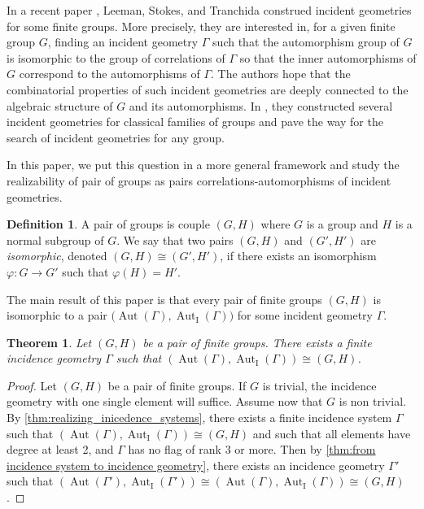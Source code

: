 \documentclass{amsart}
\newtheorem{thmx}{Theorem}
\theoremstyle{definition}
\newtheorem{definition}[theorem]{Definition}
\theoremstyle{remark}
\newcommand{\Aut}{\operatorname{Aut}}
\newcommand{\AutI}{\Aut_{\text{I}}}
\begin{document}
In a recent paper \cite{LST2025}, Leeman, Stokes, and Tranchida construed incident geometries for some finite groups. More precisely, they are interested in, for a given finite group $G$, finding an incident geometry $\Gamma$ such that the automorphism group of $G$ is isomorphic to the group of correlations of $\Gamma$ so that the inner automorphisms of $G$ correspond to the automorphisms of $\Gamma$. The authors hope that the combinatorial properties of such incident geometries are deeply connected to the algebraic structure of $G$ and its automorphisms. In \cite{LST2025}, they constructed several incident geometries for classical families of groups and pave the way for the search of incident geometries for any group. 

In this paper, we put this question in a more general framework and study the realizability of pair of groups as pairs correlations-automorphisms of incident geometries.

\begin{definition}\label{def:pair_of_groups}
A pair of groups is couple $(G,H)$ where $G$ is a group and $H$ is a normal subgroup of $G$. We say that two pairs $(G,H)$ and $(G',H')$ are \emph{isomorphic}, denoted $(G,H)\cong(G',H')$,  if there exists an isomorphism $\varphi\colon G\to G'$ such that $\varphi(H)=H'$.
\end{definition}

The main result of this paper is that every pair of finite groups $(G,H)$ is isomorphic to a pair $\big(\Aut(\Gamma),\AutI(\Gamma)\big)$ for some incident geometry $\Gamma$. 

\begin{thmx}\label{thmA}
Let $(G,H)$ be a pair of finite groups. There exists a finite incidence geometry $\Gamma$ such that $(\Aut(\Gamma),\AutI(\Gamma))\cong (G,H)$.
\end{thmx}

\begin{proof} Let $(G,H)$ be a pair of finite groups.
If $G$ is trivial, the incidence geometry with one single element will suffice. Assume now that $G$ is non trivial.
By \autoref{thm:realizing_inicedence_systems}, there exists a finite incidence system $\Gamma$ such that $(\Aut(\Gamma),\AutI(\Gamma))\cong (G,H)$ and such that all elements have degree at least 2, and $\Gamma$ has no flag of rank $3$ or more. Then by \autoref{thm:from incidence system to incidence geometry}, there exists an incidence geometry $\Gamma'$ such that $(\Aut(\Gamma'),\AutI(\Gamma'))\cong (\Aut(\Gamma),\AutI(\Gamma))\cong(G,H)$.
\end{proof}
\end{document}
